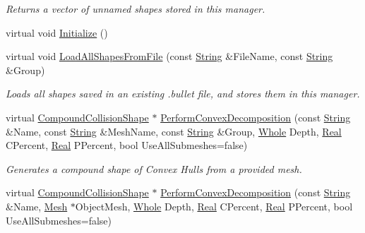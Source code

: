 \begin{DoxyCompactItemize}
\begin{DoxyCompactList}\small\item\em Returns a vector of unnamed shapes stored in this manager. \item\end{DoxyCompactList}\item 
virtual void \hyperlink{classphys_1_1CollisionShapeManager_a349f08d5cfb39d39360e41c6d416984f}{Initialize} ()
\item 
virtual void \hyperlink{classphys_1_1CollisionShapeManager_aa87f54973f867f28060eae3451a8e7fd}{LoadAllShapesFromFile} (const \hyperlink{namespacephys_aa03900411993de7fbfec4789bc1d392e}{String} \&FileName, const \hyperlink{namespacephys_aa03900411993de7fbfec4789bc1d392e}{String} \&Group)
\begin{DoxyCompactList}\small\item\em Loads all shapes saved in an existing .bullet file, and stores them in this manager. \item\end{DoxyCompactList}\item 
virtual \hyperlink{classphys_1_1CompoundCollisionShape}{CompoundCollisionShape} $\ast$ \hyperlink{classphys_1_1CollisionShapeManager_a37bee998b0e56cc4d9ecbaa5a2908d1c}{PerformConvexDecomposition} (const \hyperlink{namespacephys_aa03900411993de7fbfec4789bc1d392e}{String} \&Name, const \hyperlink{namespacephys_aa03900411993de7fbfec4789bc1d392e}{String} \&MeshName, const \hyperlink{namespacephys_aa03900411993de7fbfec4789bc1d392e}{String} \&Group, \hyperlink{namespacephys_a460f6bc24c8dd347b05e0366ae34f34a}{Whole} Depth, \hyperlink{namespacephys_af7eb897198d265b8e868f45240230d5f}{Real} CPercent, \hyperlink{namespacephys_af7eb897198d265b8e868f45240230d5f}{Real} PPercent, bool UseAllSubmeshes=false)
\begin{DoxyCompactList}\small\item\em Generates a compound shape of Convex Hulls from a provided mesh. \item\end{DoxyCompactList}\item 
virtual \hyperlink{classphys_1_1CompoundCollisionShape}{CompoundCollisionShape} $\ast$ \hyperlink{classphys_1_1CollisionShapeManager_a7369cb000ec5e06a5164d400e80a3e13}{PerformConvexDecomposition} (const \hyperlink{namespacephys_aa03900411993de7fbfec4789bc1d392e}{String} \&Name, \hyperlink{classphys_1_1Mesh}{Mesh} $\ast$ObjectMesh, \hyperlink{namespacephys_a460f6bc24c8dd347b05e0366ae34f34a}{Whole} Depth, \hyperlink{namespacephys_af7eb897198d265b8e868f45240230d5f}{Real} CPercent, \hyperlink{namespacephys_af7eb897198d265b8e868f45240230d5f}{Real} PPercent, bool UseAllSubmeshes=false)

\end{DoxyCompactItemize}
